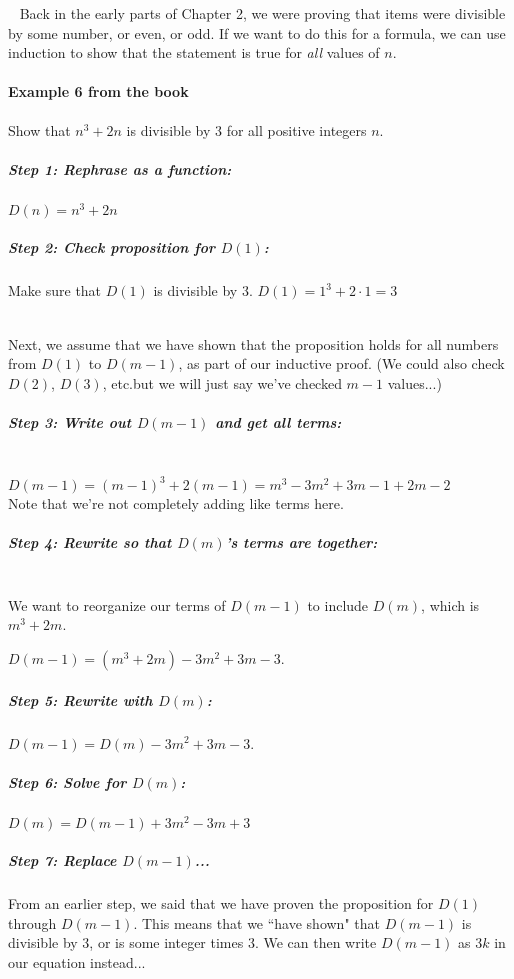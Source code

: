         \begin{intro}{\ }
            \small 
            Back in the early parts of Chapter 2, we were proving that
            items were divisible by some number, or even, or odd.
            If we want to do this for a formula, we can use induction
            to show that the statement is true for \textit{all}
            values of $n$.

            \paragraph{Example 6 from the book}
                Show that $n^{3} + 2n$ is divisible by 3 for all positive
                integers $n$.

            \subparagraph{Step 1: Rephrase as a function:}
                $D(n) = n^{3} + 2n$

            \subparagraph{Step 2: Check proposition for $D(1)$:}
                Make sure that $D(1)$ is divisible by 3. \tab
                $D(1) = 1^{3} + 2 \cdot 1 = 3$ \checkmark{}

            ~\\
            Next, we assume that we have shown that the proposition holds
            for all numbers from $D(1)$ to $D(m-1)$, as part of our inductive
            proof. (We could also check $D(2)$, $D(3)$, etc.but we will just say
            we've checked $m-1$ values...)

            \subparagraph{Step 3: Write out $D(m-1)$ and get all terms:} ~\\            
                $D(m-1) = (m-1)^{3} + 2(m-1) = m^{3} - 3m^{2} + 3m - 1 + 2m - 2$ \\
                Note that we're not completely adding like terms here.

            \subparagraph{Step 4: Rewrite so that $D(m)$'s terms are together:} ~\\
                We want to reorganize our terms of $D(m-1)$ to include $D(m)$, which is
                $m^{3} + 2m$.

                $D(m-1) = (m^{3} + 2m) - 3m^{2} + 3m - 3$.

            \subparagraph{Step 5: Rewrite with $D(m)$:}
                $D(m-1) = D(m) - 3m^{2} + 3m - 3$.

            \subparagraph{Step 6: Solve for $D(m)$:}
                $D(m) = D(m-1) + 3m^{2} - 3m + 3$

            \subparagraph{Step 7: Replace $D(m-1)$...}
                From an earlier step, we said that we have proven
                the proposition for $D(1)$ through $D(m-1)$. This means
                that we ``have shown" that $D(m-1)$ is divisible by 3, or
                is some integer times 3. We can then write $D(m-1)$ as
                $3k$ in our equation instead...


\end{intro}
